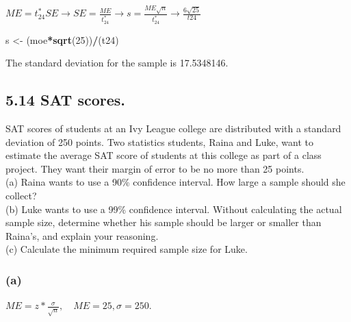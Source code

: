 \documentclass[]{article}
\newenvironment{Shaded}{\begin{snugshade}}{\end{snugshade}}
\newcommand{\KeywordTok}[1]{\textcolor[rgb]{0.13,0.29,0.53}{\textbf{#1}}}
\newcommand{\DecValTok}[1]{\textcolor[rgb]{0.00,0.00,0.81}{#1}}
\newcommand{\FloatTok}[1]{\textcolor[rgb]{0.00,0.00,0.81}{#1}}
\newcommand{\StringTok}[1]{\textcolor[rgb]{0.31,0.60,0.02}{#1}}
\newcommand{\CommentTok}[1]{\textcolor[rgb]{0.56,0.35,0.01}{\textit{#1}}}
\newcommand{\OperatorTok}[1]{\textcolor[rgb]{0.81,0.36,0.00}{\textbf{#1}}}
\newcommand{\NormalTok}[1]{#1}
\begin{document}
\(ME = t_{24}^{*}SE \to SE = \frac{ME}{t_{24}^{*}} \to s = \frac{ME\sqrt{n}}{t_{24}^{*}} \to \frac{6\sqrt{25}}{t24}\)\\

\begin{Shaded}
\begin{Highlighting}[]
\NormalTok{s <-}\StringTok{ }\NormalTok{(moe}\OperatorTok{*}\KeywordTok{sqrt}\NormalTok{(}\DecValTok{25}\NormalTok{))}\OperatorTok{/}\NormalTok{(t24)}
\end{Highlighting}
\end{Shaded}

The standard deviation for the sample is 17.5348146.

\subsection{5.14 SAT scores.}\label{sat-scores.}

SAT scores of students at an Ivy League college are distributed with a
standard deviation of 250 points. Two statistics students, Raina and
Luke, want to estimate the average SAT score of students at this college
as part of a class project. They want their margin of error to be no
more than 25 points.\\
(a) Raina wants to use a 90\% confidence interval. How large a sample
should she collect?\\
(b) Luke wants to use a 99\% confidence interval. Without calculating
the actual sample size, determine whether his sample should be larger or
smaller than Raina's, and explain your reasoning.\\
(c) Calculate the minimum required sample size for Luke.

\subsubsection{(a)}\label{a}

\(ME = z*\frac{\sigma}{\sqrt{n}}, \quad ME = 25, \sigma = 250\).

\begin{Shaded}
\end{Shaded}
\end{document}
